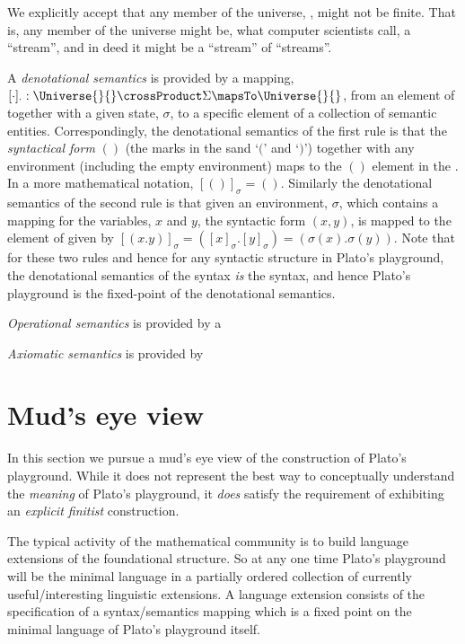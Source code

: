 We explicitly accept that any member of the universe, \Universe{}{}, might not
be finite. That is, any member of the universe might be, what computer
scientists call, a ``stream'', and in deed it might be a ``stream'' of
``streams''.

A \emph{denotational semantics} is provided by a mapping, $[ \cdot ]_{\cdot} :
\Universe{}{} \crossProduct \Sigma \mapsTo \Universe{}{}$, from an element of
\Universe{}{} together with a given state, $\sigma$, to a specific element of a
collection of semantic entities. Correspondingly, the denotational semantics of
the first rule is that the \emph{syntactical form} $()$ (the marks in the sand
`$($' and `$)$') together with any environment (including the empty environment)
maps to the $()$ element in the \Universe{}{}. In a more mathematical notation,
$[()]_{\sigma} = ()$. Similarly the denotational semantics of the second rule is
that given an environment, $\sigma$, which contains a mapping for the variables,
$x$ and $y$, the syntactic form $(x , y)$, is mapped to the element of
\Universe{}{} given by $[ ( x . y ) ]_{\sigma} = ( [x]_{\sigma} . [y]_{\sigma} )
= ( \sigma(x) . \sigma(y) )$. Note that for these two rules and hence for any
syntactic structure in Plato's playground, the denotational semantics of the
syntax \emph{is} the syntax, and hence Plato's playground is the fixed-point of
the denotational semantics.

\emph{Operational semantics} is provided by a 

\emph{Axiomatic semantics} is provided by

\section{Mud's eye view}

In this section we pursue a mud's eye view of the construction of Plato's
playground. While it does not represent the best way to conceptually understand
the \emph{meaning} of Plato's playground, it \emph{does} satisfy the requirement
of exhibiting an \emph{explicit finitist} construction.

The typical activity of the mathematical community is to build language
extensions of the foundational structure. So at any one time Plato's playground
will be the minimal language in a partially ordered collection of currently
useful/interesting linguistic extensions. A language extension consists of the
specification of a syntax/semantics mapping which is a fixed point on the
minimal language of Plato's playground itself.

